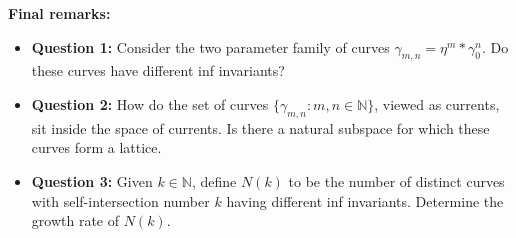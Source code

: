 \documentclass[12pt]{amsart}
\numberwithin{equation}{section}
\theoremstyle{plain}
\begin{document}
\noindent \textbf{Final remarks:}  


\vskip5pt
\begin{itemize}
    \item \textbf{Question 1:} Consider the two parameter family of curves $\gamma_{m,n} =\eta^{m}\ast\gamma_{0}^{n}$. Do these curves have different inf invariants?
    
    \item \textbf{Question 2:} How do the set of curves  $\{\gamma_{m,n}: {m,n \in  \mathbb{N}}\}$, viewed as currents,  sit inside the space of currents. Is there a natural subspace for which these curves form a lattice.
    
    \item \textbf{Question 3:} Given $k \in \mathbb{N}$, define $N(k)$ to be the number of distinct curves with self-intersection number $k$ having different inf invariants. Determine the growth rate of $N(k)$.

    \end{itemize} 

 









\newpage



\end{document}
